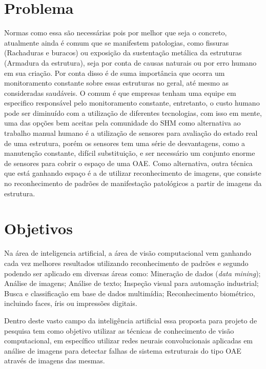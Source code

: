 \section{Problema}

Normas como essa são necessárias pois por melhor que seja o concreto, atualmente ainda é comum que se manifestem patologias, como fissuras (Rachaduras e buracos) ou exposição da sustentação metálica da estruturas (Armadura da estrutura), seja por conta de causas naturais ou por erro humano em sua criação. Por conta disso é de suma importância que ocorra um monitoramento constante sobre essas estruturas no geral, até mesmo as consideradas saudáveis. 
O comum é que empresas tenham uma equipe em especifico responsável pelo monitoramento constante, entretanto, o custo humano pode ser diminuído com a utilização de diferentes tecnologias, com isso em mente, uma das opções bem aceitas pela comunidade do SHM como alternativa ao trabalho manual humano é a utilização de sensores para avaliação do estado real de uma estrutura, porém os sensores tem uma série de desvantagens, como a manutenção constante, difícil substituição, e ser necessário um conjunto enorme de sensores para cobrir o espaço de uma OAE. Como alternativa, outra técnica que está ganhando espaço é a de utilizar reconhecimento de imagens, que consiste no reconhecimento de padrões de manifestação patológicos a partir de imagens da estrutura.


\section{Objetivos}

Na área de inteligencia artificial, a área de visão computacional vem ganhando cada vez melhores resultados utilizando reconhecimento de padrões e segundo  podendo ser aplicado em diversas áreas como: Mineração de dados (\textit{data mining}); Análise de imagens; Análise de texto; Inspeção visual para automação industrial; Busca e classificação em base de dados multimídia; Reconhecimento biométrico, incluindo faces, íris ou impressões digitais.

Dentro deste vasto campo da inteligência artificial essa proposta para projeto de pesquisa tem como objetivo utilizar as técnicas de conhecimento de visão computacional, em específico utilizar redes neurais convolucionais aplicadas em análise de imagens para detectar falhas de sistema estruturais do tipo OAE através de imagens das mesmas. 

